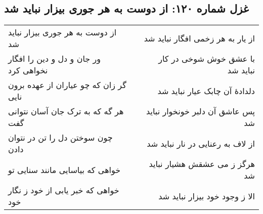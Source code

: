 \begin{center}
\section*{غزل شماره ۱۲۰: از دوست به هر جوری بیزار نباید شد}
\label{sec:120}
\begin{longtable}{l p{0.5cm} r}
از دوست به هر جوری بیزار نباید شد
&&
از یار به هر زخمی افگار نباید شد
\\
ور جان و دل و دین را افگار نخواهی کرد
&&
با عشق خوش شوخی در کار نباید شد
\\
گر زان که چو عیاران از عهده برون نایی
&&
دلدادهٔ آن چابک عیار نباید شد
\\
هر گه که به ترک جان آسان نتوانی گفت
&&
پس عاشق آن دلبر خونخوار نباید شد
\\
چون سوختن دل را تن در نتوان دادن
&&
از لاف به رعنایی در نار نباید شد
\\
خواهی که بیاسایی مانند سنایی تو
&&
هرگز ز می عشقش هشیار نباید شد
\\
خواهی که خبر یابی از خود ز نگار خود
&&
الا ز وجود خود بیزار نباید شد
\\
\end{longtable}
\end{center}
